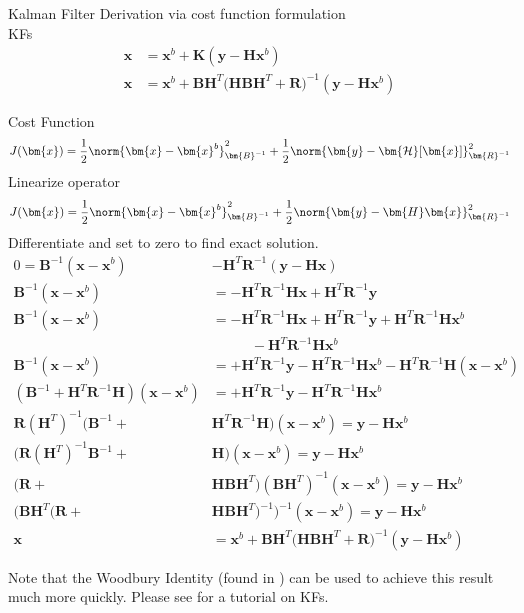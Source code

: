\documentclass{article}
\begin{document}
Kalman Filter Derivation via cost function formulation \label{appendix:KF_costfn} \\

KFs
\begin{align}
\bm{x} &= \bm{x}^b + \bm{K} ( \bm{y} - \bm{H}\bm{x}^b) \\
\bm{x} &= \bm{x}^b + \bm{B}\bm{H}^T \big ( \bm{H} \bm{B} \bm{H}^T + \bm{R} \big)^{-1} ( \bm{y} - \bm{H}\bm{x}^b)
\end{align}

Cost Function
\begin{align}
    J(\bm{x}) = \frac{1}{2}\norm{ \bm{x}- \bm{x}^b }^2_{\bm{B}^{-1}} + \frac{1}{2}\norm{\bm{y} - \bm{\mathcal{H}}[\bm{x}]}^2_{\bm{R}^{-1}}
 \end{align}
 Linearize operator
 \begin{align}
    J(\bm{x}) = \frac{1}{2}\norm{ \bm{x}- \bm{x}^b }^2_{\bm{B}^{-1}} + \frac{1}{2}\norm{\bm{y} - \bm{H}\bm{x}}^2_{\bm{R}^{-1}}
 \end{align}
 Differentiate and set to zero to find exact solution.
  \begin{align*}
    0 = \bm{B}^{-1} ( \bm{x}- \bm{x}^b)  &-\bm{H}^T \bm{R}^{-1} (\bm{y} - \bm{H}\bm{x} ) \\
     \bm{B}^{-1} ( \bm{x}- \bm{x}^b) &= -\bm{H}^T\bm{R}^{-1} \bm{H}\bm{x} +\bm{H}^T\bm{R}^{-1}  \bm{y} \\
\bm{B}^{-1} ( \bm{x}- \bm{x}^b) &= -\bm{H}^T\bm{R}^{-1} \bm{H}\bm{x} +\bm{H}^T\bm{R}^{-1}  \bm{y}  +\bm{H}^T\bm{R}^{-1} \bm{H}\bm{x}^b\\
& \;\;\;\;\;  \;\;\;\;\;   -\bm{H}^T\bm{R}^{-1} \bm{H}\bm{x}^b \\
\bm{B}^{-1} ( \bm{x}- \bm{x}^b) &=  +\bm{H}^T\bm{R}^{-1}  \bm{y}   -\bm{H}^T\bm{R}^{-1} \bm{H}\bm{x}^b - \bm{H}^T\bm{R}^{-1} \bm{H}( \bm{x}- \bm{x}^b) \\
(\bm{B}^{-1} + \bm{H}^T\bm{R}^{-1} \bm{H}) ( \bm{x}- \bm{x}^b) &=  +\bm{H}^T\bm{R}^{-1}  \bm{y}   -\bm{H}^T\bm{R}^{-1} \bm{H}\bm{x}^b \\
\bm{R}(\bm{H}^T)^{-1}(\bm{B}^{-1} + &\bm{H}^T\bm{R}^{-1} \bm{H}) ( \bm{x}- \bm{x}^b) =  \bm{y}   - \bm{H}\bm{x}^b\\
\big(\bm{R}(\bm{H}^T)^{-1}\bm{B}^{-1} + &\bm{H} \big) ( \bm{x}- \bm{x}^b) =  \bm{y}   - \bm{H}\bm{x}^b \\
\big(\bm{R} + &\bm{H} \bm{B}\bm{H}^{T}\big) (\bm{B}\bm{H}^{T})^{-1}( \bm{x}- \bm{x}^b) =  \bm{y}   - \bm{H}\bm{x}^b \\
\big( \bm{B}\bm{H}^{T}(\bm{R} + &\bm{H} \bm{B}\bm{H}^{T})^{-1}\big)^{-1}( \bm{x}- \bm{x}^b) =  \bm{y}   - \bm{H}\bm{x}^b \\
\bm{x} &= \bm{x}^b + \bm{B}\bm{H}^T \big ( \bm{H} \bm{B} \bm{H}^T + \bm{R} \big)^{-1} ( \bm{y} - \bm{H}\bm{x}^b)
 \end{align*}
 
Note that the Woodbury Identity (found in \cite{cookbook}) can be used to achieve this result much more quickly. Please see \cite{Lacey1998} for a tutorial on KFs. 
\end{document}

